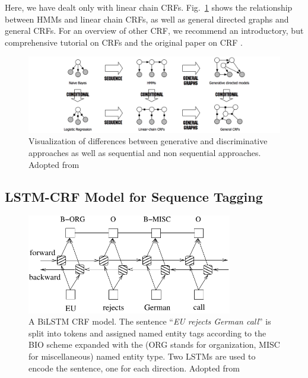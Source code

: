 Here, we have dealt only with linear chain CRFs.
Fig.~\ref{fig:different_graphicals} shows the relationship between HMMs and
linear chain CRFs, as well as general directed graphs and general CRFs. 
For an overview of other CRF,
we recommend an introductory, but comprehensive tutorial on CRFs
\citep{sutton2012introduction} and the original paper on CRF 
\citep{lafferty2001conditional}. 


\begin{figure}
	\includegraphics[width=\textwidth]{different_markovs.png}
	\caption{Visualization of differences between generative and discriminative approaches
	as well as sequential and non sequential approaches.
	Adopted from \citep{sutton2012introduction}}
	\label{fig:different_graphicals}
\end{figure}



\subsection{LSTM-CRF Model for Sequence Tagging}
\label{subsec:lstm_crf}

\begin{figure}
	\centering
	\includegraphics[width=0.8\textwidth]{biLstmCRF.pdf}
	\caption{A BiLSTM CRF model. The sentence 
	``\emph{EU rejects German call}'' is split into tokens
	and assigned named entity tags according to the BIO scheme
	expanded with the (ORG stands for organization, MISC for 
	miscellaneous) named entity type. 
	Two LSTMs are used to encode the sentence, one for each direction. 
	Adopted from 
	\citep{huang2015bidirectional}
	}
	\label{fig:bilstm_crf}
\end{figure}

